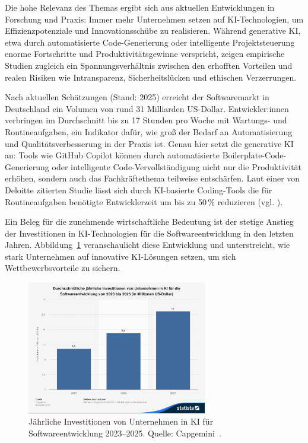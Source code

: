 Die hohe Relevanz des Themas ergibt sich aus aktuellen Entwicklungen in
Forschung und Praxis: Immer mehr Unternehmen setzen auf KI-Technologien, um
Effizienzpotenziale und Innovationsschübe zu realisieren. Während generative
KI, etwa durch automatisierte Code-Generierung oder intelligente
Projektsteuerung enorme Fortschritte und Produktivitätsgewinne verspricht,
zeigen empirische Studien zugleich ein Spannungsverhältnis zwischen den
erhofften Vorteilen und realen Risiken wie Intransparenz, Sicherheitslücken und
ethischen Verzerrungen.

Nach aktuellen Schätzungen (Stand: 2025) erreicht der Softwaremarkt in
Deutschland ein Volumen von rund 31 Milliarden US-Dollar. Entwickler:innen
verbringen im Durchschnitt bis zu 17 Stunden pro Woche mit Wartungs- und
Routineaufgaben, ein Indikator dafür, wie groß der Bedarf an Automatisierung
und Qualitätsverbesserung in der Praxis ist. Genau hier setzt die generative KI
an: Tools wie GitHub Copilot können durch automatisierte
Boilerplate-Code-Generierung oder intelligente Code-Vervollständigung nicht nur
die Produktivität erhöhen, sondern auch das Fachkräftethema teilweise
entschärfen. Laut einer von Deloitte zitierten Studie lässt sich durch
KI-basierte Coding-Tools die für Routineaufgaben benötigte Entwicklerzeit um
bis zu 50\,\% reduzieren (vgl. \cite{s_future_2024}
\cite{siebert_generative_2024}).

Ein Beleg für die zunehmende wirtschaftliche Bedeutung ist der stetige Anstieg
der Investitionen in KI-Technologien für die Softwareentwicklung in den letzten
Jahren. Abbildung~\ref{fig:ki-investitionen} veranschaulicht diese Entwicklung
und unterstreicht, wie stark Unternehmen auf innovative KI-Lösungen setzen, um
sich Wettbewerbsvorteile zu sichern.

\begin{figure}[H]
    \centering
    \vspace{1em}
    \includegraphics[width=0.7\textwidth]{images/abbildungen/statistic_id1481131_jaehrliche-investitionen-von-unternehmen-in-ki-fuer-softwareentwicklung-bis-2025.png}
    \caption{Jährliche Investitionen von Unternehmen in KI für Softwareentwicklung 2023–2025. Quelle: Capgemini~\cite{statista_ki_investitionen_2025}.}
    \label{fig:ki-investitionen}
\end{figure}

